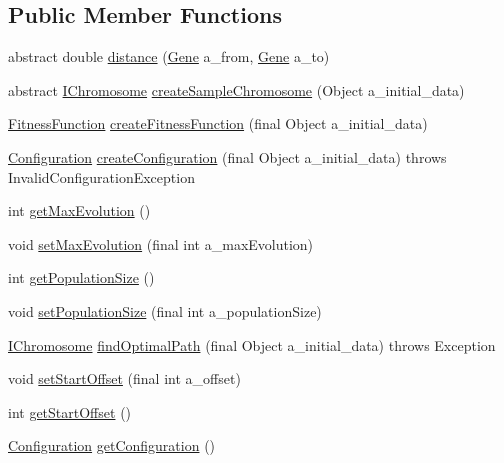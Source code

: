 \subsection*{Public Member Functions}
\begin{DoxyCompactItemize}
\item 
abstract double \hyperlink{classorg_1_1jgap_1_1impl_1_1salesman_1_1_salesman_a423725e8d0b857402a4db166061137aa}{distance} (\hyperlink{interfaceorg_1_1jgap_1_1_gene}{Gene} a\-\_\-from, \hyperlink{interfaceorg_1_1jgap_1_1_gene}{Gene} a\-\_\-to)
\item 
abstract \hyperlink{interfaceorg_1_1jgap_1_1_i_chromosome}{I\-Chromosome} \hyperlink{classorg_1_1jgap_1_1impl_1_1salesman_1_1_salesman_a862317900d8463de5375560a20b2df34}{create\-Sample\-Chromosome} (Object a\-\_\-initial\-\_\-data)
\item 
\hyperlink{classorg_1_1jgap_1_1_fitness_function}{Fitness\-Function} \hyperlink{classorg_1_1jgap_1_1impl_1_1salesman_1_1_salesman_accdccbaa500b8c5ad94cd861cf7e9306}{create\-Fitness\-Function} (final Object a\-\_\-initial\-\_\-data)
\item 
\hyperlink{classorg_1_1jgap_1_1_configuration}{Configuration} \hyperlink{classorg_1_1jgap_1_1impl_1_1salesman_1_1_salesman_a193cb2998893eb36fc7d37cc87d24326}{create\-Configuration} (final Object a\-\_\-initial\-\_\-data)  throws Invalid\-Configuration\-Exception 
\item 
int \hyperlink{classorg_1_1jgap_1_1impl_1_1salesman_1_1_salesman_ad5ff641569964f2c82cdc769e18fa9ec}{get\-Max\-Evolution} ()
\item 
void \hyperlink{classorg_1_1jgap_1_1impl_1_1salesman_1_1_salesman_a490c23524355029fb233ba131371019e}{set\-Max\-Evolution} (final int a\-\_\-max\-Evolution)
\item 
int \hyperlink{classorg_1_1jgap_1_1impl_1_1salesman_1_1_salesman_a493897c0bbe0d11d7c600bfc8bff882d}{get\-Population\-Size} ()
\item 
void \hyperlink{classorg_1_1jgap_1_1impl_1_1salesman_1_1_salesman_a35ae7583e5a7148d600351147e8b24b6}{set\-Population\-Size} (final int a\-\_\-population\-Size)
\item 
\hyperlink{interfaceorg_1_1jgap_1_1_i_chromosome}{I\-Chromosome} \hyperlink{classorg_1_1jgap_1_1impl_1_1salesman_1_1_salesman_a17270454b42f21cf42819a47c65c65ee}{find\-Optimal\-Path} (final Object a\-\_\-initial\-\_\-data)  throws Exception 
\item 
void \hyperlink{classorg_1_1jgap_1_1impl_1_1salesman_1_1_salesman_a2b2c4a050ea8d6b8974465a3ca933d9e}{set\-Start\-Offset} (final int a\-\_\-offset)
\item 
int \hyperlink{classorg_1_1jgap_1_1impl_1_1salesman_1_1_salesman_abcd6189164cf7f797c141a43d12d66a3}{get\-Start\-Offset} ()
\item 
\hyperlink{classorg_1_1jgap_1_1_configuration}{Configuration} \hyperlink{classorg_1_1jgap_1_1impl_1_1salesman_1_1_salesman_a2d0c09a1b99ae518259a4e551fe12d3b}{get\-Configuration} ()
\end{DoxyCompactItemize}
